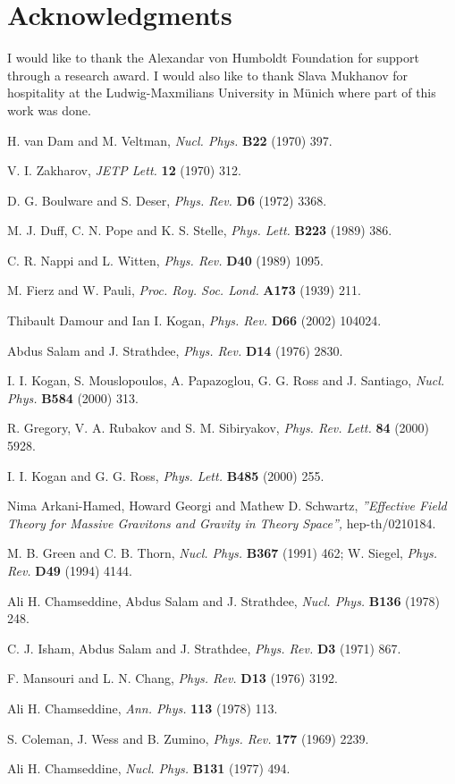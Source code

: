 \documentclass[a4paper,12pt]{article}
\begin{document}
\section{Acknowledgments}

I would like to thank the Alexandar von Humboldt Foundation for support
through a research award. I would also like to thank Slava Mukhanov for
hospitality at the Ludwig-Maxmilians University in M\"{u}nich where part of
this work was done.

\begin{thebibliography}{99}
H. van Dam and M. Veltman, \textit{Nucl. Phys. }\textbf{B22}
(1970) 397.

V. I. Zakharov, \textit{JETP Lett. }\textbf{12 }(1970) 312.

D. G. Boulware and S. Deser, \textit{Phys. Rev. }\textbf{D6
}(1972) 3368.

M. J. Duff, C. N. Pope and K. S. Stelle, \textit{Phys. Lett.
}\textbf{B223 }(1989) 386.

C. R. Nappi and L. Witten, \textit{Phys. Rev. }\textbf{D40 }(1989) 1095.

M. Fierz and W. Pauli, \textit{Proc. Roy. Soc. Lond. }\textbf{A173
}(1939) 211.

Thibault Damour and Ian I. Kogan, \textit{Phys. Rev. }\textbf{D66
}(2002) 104024.

Abdus Salam and J. Strathdee, \textit{Phys. Rev. }\textbf{D14
}(1976) 2830.

I. I. Kogan, S. Mouslopoulos, A. Papazoglou, G. G. Ross and J.
Santiago, \textit{Nucl. Phys. }\textbf{B584 }(2000) 313.

R. Gregory, V. A. Rubakov and S. M. Sibiryakov, \textit{Phys.
Rev. Lett. }\textbf{84 }(2000) 5928.

I. I. Kogan and G. G. Ross, \textit{Phys. Lett. }\textbf{B485
}(2000) 255.

Nima Arkani-Hamed, Howard Georgi and Mathew D. Schwartz,
\textit{''Effective Field Theory for Massive Gravitons and Gravity in Theory
Space'', }hep-th/0210184.

M. B. Green and C. B. Thorn, \textit{Nucl. Phys. }\textbf{B367
}(1991) 462; W. Siegel, \textit{Phys. Rev. }\textbf{D49 }(1994) 4144.

Ali H. Chamseddine, Abdus Salam and J. Strathdee, \textit{Nucl.
Phys. }\textbf{B136 }(1978) 248.

C. J. Isham, Abdus Salam and J. Strathdee, \textit{Phys. Rev.
}\textbf{D3 }(1971) 867.

F. Mansouri and L. N. Chang, \textit{Phys. Rev. }\textbf{D13
}(1976) 3192.

Ali H. Chamseddine, \textit{Ann. Phys. }\textbf{113 }(1978) 113.

S. Coleman, J. Wess and B. Zumino, \textit{Phys. Rev. }\textbf{177
}(1969) 2239.

Ali H. Chamseddine, \textit{Nucl. Phys. }\textbf{B131 }(1977) 494.
\end{thebibliography}
\end{document}
